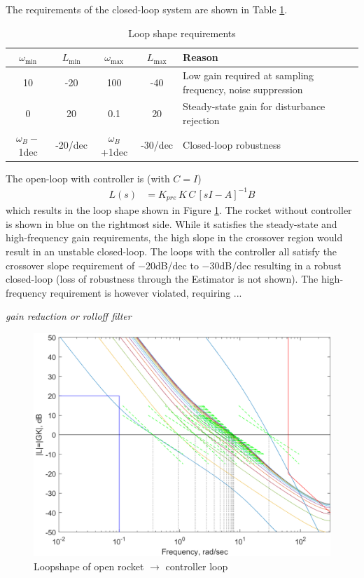 The requirements of the closed-loop system are shown in Table \ref{tab:controller_loopshape}.
\begin{table}[ht]
    \centering
    \begin{tabularx}{\linewidth}{c c | c c | X }
         $\omega_\text{min}$ & $L_\text{min}$ & $\omega_\text{max}$ & $L_\text{max}$ & Reason \\
         \hline
         10 & -20 & 100 & -40 & Low gain required at sampling frequency, noise suppression \\
         0 & 20 & 0.1 & 20 & Steady-state gain for disturbance rejection \\
         $\omega_B-$1dec & -20/dec & $\omega_B$+1dec & -30/dec & Closed-loop robustness
    \end{tabularx}
    \caption{Loop shape requirements}
    \label{tab:controller_loopshape}
\end{table}

The open-loop with controller is (with $C=I$) 
\begin{align}
    L(s) &=  K_{pre}\,  K \, C \, \left[sI- A\right]^{-1} B
\end{align}
which results in the loop shape shown in Figure \ref{fig:controller_loopshape}.
The rocket without controller is shown in blue on the rightmost side. 
While it satisfies the steady-state and high-frequency gain requirements, the high slope in the crossover region would result in an unstable closed-loop.
The loops with the controller all satisfy the crossover slope requirement of $-20$dB/dec to $-30$dB/dec resulting in a robust closed-loop (loss of robustness through the Estimator is not shown). 
The high-frequency requirement is however violated, requiring ... 

\emph{gain reduction or rolloff filter}

\begin{figure}[ht]
    \centering
    \includegraphics[width=0.7\linewidth]{images-design/controller_loopshape.png}
    \caption{Loopshape of open rocket $\to$ controller loop}
    \label{fig:controller_loopshape}
\end{figure}

